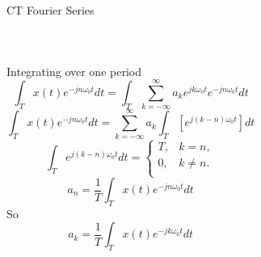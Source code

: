 \begin{frame}{CT Fourier Series}
\begin{columns}
{            }

    \end{columns}


\end{frame}


\begin{frame}[plain]
    \begin{columns}
            {
                Integrating over one period
                \begin{equation*}
                    \int_{T}x(t)e^{-jn\omega_0t}dt = \int_{T}\sum_{k=-\infty}^{\infty}a_k e^{jk\omega_0 t}e^{-jn\omega_0t}dt
                \end{equation*}
                \pause
                \begin{equation*}
                    \int_{T}x(t)e^{-jn\omega_0t}dt = \sum_{k=-\infty}^{\infty}a_k \int_{T} \left[e^{j(k-n)\omega_0 t}\right]dt
                \end{equation*}
                \pause
                \begin{equation*}
                    \int_{T} e^{j(k-n)\omega_0 t} dt = \begin{cases}T, & k = n,\\ 0, & k \neq n.\\\end{cases}
                \end{equation*}
                \pause
                \begin{equation*}
                    a_n = \frac{1}{T}\int_{T} x(t) e^{-jn\omega_0 t}dt
                \end{equation*}
                So
                \pause
                \begin{equation*}
                    a_k = \frac{1}{T}\int_{T} x(t) e^{-jk\omega_0 t}dt
                \end{equation*}


            }
            {



            }

    \end{columns}
\end{frame}


%


